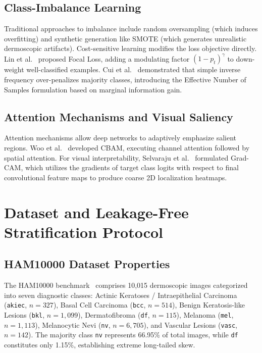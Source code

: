 \documentclass[conference]{IEEEtran}
\begin{document}
\subsection{Class-Imbalance Learning}
Traditional approaches to imbalance include random oversampling (which induces overfitting) and synthetic generation like SMOTE (which generates unrealistic dermoscopic artifacts). Cost-sensitive learning modifies the loss objective directly. Lin et al.~\cite{lin2017} proposed Focal Loss, adding a modulating factor $(1 - p_t)^\gamma$ to down-weight well-classified examples. Cui et al.~\cite{cui2019} demonstrated that simple inverse frequency over-penalizes majority classes, introducing the Effective Number of Samples formulation based on marginal information gain.

\subsection{Attention Mechanisms and Visual Saliency}
Attention mechanisms allow deep networks to adaptively emphasize salient regions. Woo et al.~\cite{woo2018} developed CBAM, executing channel attention followed by spatial attention. For visual interpretability, Selvaraju et al.~\cite{selvaraju2017} formulated Grad-CAM, which utilizes the gradients of target class logits with respect to final convolutional feature maps to produce coarse 2D localization heatmaps.

\section{Dataset and Leakage-Free Stratification Protocol}
\subsection{HAM10000 Dataset Properties}
The HAM10000 benchmark~\cite{tschandl2018} comprises 10,015 dermoscopic images categorized into seven diagnostic classes: Actinic Keratoses / Intraepithelial Carcinoma (\texttt{akiec}, $n=327$), Basal Cell Carcinoma (\texttt{bcc}, $n=514$), Benign Keratosis-like Lesions (\texttt{bkl}, $n=1,099$), Dermatofibroma (\texttt{df}, $n=115$), Melanoma (\texttt{mel}, $n=1,113$), Melanocytic Nevi (\texttt{nv}, $n=6,705$), and Vascular Lesions (\texttt{vasc}, $n=142$). The majority class \texttt{nv} represents 66.95\% of total images, while \texttt{df} constitutes only 1.15\%, establishing extreme long-tailed skew.
\end{document}
